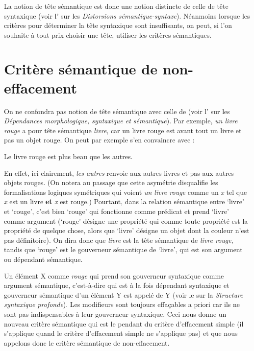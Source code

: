 La notion de tête sémantique est donc une notion distincte de celle de tête syntaxique (voir l’ sur les \textit{Distorsions sémantique-syntaxe}). Néanmoins lorsque les critères pour déterminer la tête syntaxique sont insuffisants, on peut, si l’on souhaite à tout prix choisir une tête, utiliser les critères sémantiques.

\section{Critère sémantique de non-effacement}\label{sec:3.3.18}

On ne confondra pas notion de tête sémantique avec celle de  (voir l’ sur les \textit{Dépendances morphologique, syntaxique et sémantique}). Par exemple, \textit{un livre rouge} a pour tête sémantique \textit{livre}, car un livre rouge est avant tout un livre et pas un objet rouge. On peut par exemple s’en convaincre avec :

\ea
    {Le livre rouge est plus beau que les autres.}
\z

En effet, ici clairement, \textit{les autres} renvoie aux autres livres et pas aux autres objets rouges. (On notera au passage que cette asymétrie disqualifie les formalisations logiques symétriques qui voient \textit{un livre rouge} comme un \textit{x} tel que \textit{x} est un livre \textbf{et} \textit{x} est rouge.) Pourtant, dans la relation sémantique entre ‘livre’ et ‘rouge’, c’est bien ‘rouge’ qui fonctionne comme prédicat et prend ‘livre’ comme argument (‘rouge’ désigne une propriété qui comme toute propriété est la propriété de quelque chose, alors que ‘livre’ désigne un objet dont la couleur n’est pas définitoire). On dira donc que \textit{livre} est la tête sémantique de \textit{livre rouge}, tandis que ‘rouge’ est le gouverneur sémantique de ‘livre’, qui est son argument ou dépendant sémantique.

Un élément X comme \textit{rouge} qui prend son gouverneur syntaxique comme argument sémantique, c’est-à-dire qui est à la fois dépendant syntaxique et gouverneur sémantique d’un élément Y est appelé  de Y (voir le  sur la \textit{Structure syntaxique profonde}). Les modifieurs sont toujours effaçables a priori car ils ne sont pas indispensables à leur gouverneur syntaxique. Ceci nous donne un nouveau critère sémantique qui est le pendant du critère d’effacement simple (il s’applique quand le critère d’effacement simple ne s’applique pas) et que nous appelons donc le critère sémantique de non-effacement.

